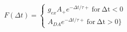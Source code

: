 $F(\Delta t) =  \begin{cases} g_{ex} A_{+} e^{−\Delta t/τ+}\:\mathrm{for\:\Delta t <0}\\A_{DA} e^{−\Delta t/τ+}\:\mathrm{for\:\Delta t > 0}\} \end{cases}$
 